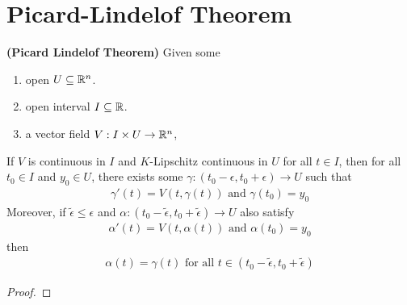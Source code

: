 \documentclass{report}
\begin{document}
\section{Picard-Lindelof Theorem}
\begin{theorem}
\label{Picard-Lindelof Theorem}
\textbf{(Picard Lindelof Theorem)} Given some 
\begin{enumerate}[label=(\alph*)]
  \item open $U\subseteq \mathbb{R}^n$. 
  \item open interval $I\subseteq \mathbb{R}$. 
  \item a vector field $V:I \times U\rightarrow \mathbb{R}^n$,  
\end{enumerate}
If $V$ is continuous in  $I$ and  $K$-Lipschitz continuous in  $U$ for all  $t \in I$, then for all $t_0\in I$ and $y_0 \in U$, there exists some $\gamma :(t_0- \epsilon ,t_0+\epsilon )\rightarrow U$ such that 
\begin{align*}
\gamma'(t)=V(t,\gamma (t))\text{ and }\gamma (t_0)=y_0
\end{align*}
Moreover, if $\tilde{\epsilon }\leq \epsilon  $ and $\alpha:(t_0-\tilde{\epsilon }  ,t_0+\tilde{\epsilon }  )\rightarrow U$ also satisfy 
\begin{align*}
\alpha '(t)=V(t,\alpha (t))\text{ and }\alpha (t_0)=y_0
\end{align*}
then 
\begin{align*}
\alpha (t)=\gamma (t)\text{ for all }t\in (t_0-\tilde{\epsilon },t_0+\tilde{\epsilon })
\end{align*}
\end{theorem}
\begin{proof}

\end{proof}
\begin{mdframed}

\end{mdframed}
\end{document}
